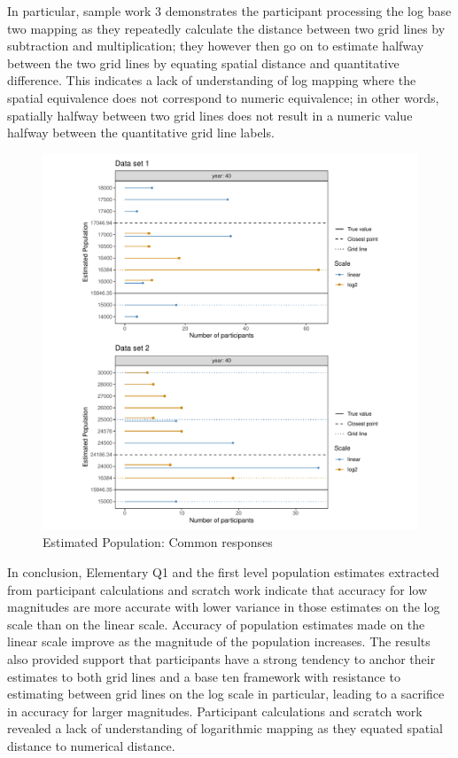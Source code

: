 \documentclass[print]{nuthesis}
\begin{document}
In particular, sample work 3 demonstrates the participant processing the log base two mapping as they repeatedly calculate the distance between two grid lines by subtraction and multiplication; they however then go on to estimate halfway between the two grid lines by equating spatial distance and quantitative difference.
This indicates a lack of understanding of log mapping where the spatial equivalence does not correspond to numeric equivalence; in other words, spatially halfway between two grid lines does not result in a numeric value halfway between the quantitative grid line labels.

\begin{figure}[tbp]

{\centering \includegraphics[width=1\linewidth,]{thesis_files/figure-latex/common-population-estimates-1} 

}

\caption{Estimated Population: Common responses}\label{fig:common-population-estimates}
\end{figure}

In conclusion, Elementary Q1 and the first level population estimates extracted from participant calculations and scratch work indicate that accuracy for low magnitudes are more accurate with lower variance in those estimates on the log scale than on the linear scale.
Accuracy of population estimates made on the linear scale improve as the magnitude of the population increases.
The results also provided support that participants have a strong tendency to anchor their estimates to both grid lines and a base ten framework with resistance to estimating between grid lines on the log scale in particular, leading to a sacrifice in accuracy for larger magnitudes.
Participant calculations and scratch work revealed a lack of understanding of logarithmic mapping as they equated spatial distance to numerical distance.
\end{document}
